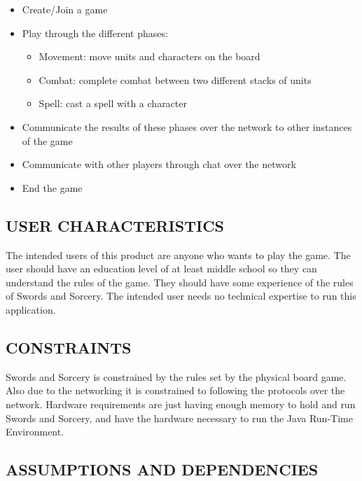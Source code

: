 \documentclass[twoside,letterpaper,pdftex]{article}
\begin{document}
\begin{itemize}
\item Create/Join a game
\item Play through the different phases:
\begin{itemize}
  \item Movement: move units and characters on the board
  \item Combat: complete combat between two different stacks of units
  \item Spell: cast a spell with a character
\end{itemize}
\item Communicate the results of these phases over the network to other instances of the game
\item Communicate with other players through chat over the network
\item End the game
\end{itemize}

\subsection[USER CHARACTERISTICS]{\rmfamily\bfseries USER CHARACTERISTICS}
\hypertarget{RefHeading17659017292}{}{\itshape
}

The intended users of this product are anyone who wants to play the game. The user
should have an education level of at least middle school so they can understand the
rules of the game. They should have some experience of the rules of Swords and Sorcery.
The intended user needs no technical expertise to run this application.

\subsection[CONSTRAINTS]{\rmfamily\bfseries CONSTRAINTS}
\hypertarget{RefHeading17859017292}{}{\itshape
}

Swords and Sorcery is constrained by the rules set by the physical board game. Also due to the networking it is constrained to following the protocols over the network. Hardware requirements are just having enough memory to hold and run Swords and Sorcery, and have the hardware necessary to run the Java Run-Time Environment. 

\subsection[ASSUMPTIONS AND DEPENDENCIES]{\rmfamily\bfseries ASSUMPTIONS AND
DEPENDENCIES}
\hypertarget{RefHeading18059017292}{}{\itshape
}
\end{document}
